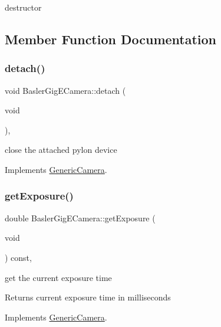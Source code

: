 destructor 

\subsection{Member Function Documentation}
\mbox{\label{class_basler_gig_e_camera_a13a51a76116cccbd537725457d83254f}} 
\subsubsection{\texorpdfstring{detach()}{detach()}}
{\footnotesize\ttfamily void Basler\+Gig\+E\+Camera\+::detach (\begin{DoxyParamCaption}\item[{void}]{ }\end{DoxyParamCaption})\hspace{0.3cm}{\ttfamily [override]}, {\ttfamily [virtual]}}

close the attached pylon device 

Implements \hyperlink{class_generic_camera_a86a91e987d6142e5417b2c07542e0aa4}{Generic\+Camera}.

\mbox{\label{class_basler_gig_e_camera_a5f7897cae5155958ecaa8b2b9196e4e6}} 
\subsubsection{\texorpdfstring{get\+Exposure()}{getExposure()}}
{\footnotesize\ttfamily double Basler\+Gig\+E\+Camera\+::get\+Exposure (\begin{DoxyParamCaption}\item[{void}]{ }\end{DoxyParamCaption}) const\hspace{0.3cm}{\ttfamily [override]}, {\ttfamily [virtual]}}

get the current exposure time \begin{DoxyReturn}{Returns}
current exposure time in milliseconds 
\end{DoxyReturn}


Implements \hyperlink{class_generic_camera_ae3fe4b50577c854037b7a77dade27487}{Generic\+Camera}.

